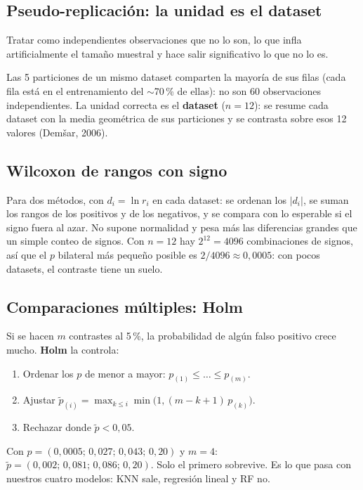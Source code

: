 \documentclass[apuntes]{uc3mmaster}
\begin{document}
\subsection{Pseudo-replicación: la unidad es el dataset}
\begin{definicion}
Tratar como independientes observaciones que no lo son, lo que infla artificialmente el tamaño muestral y hace
salir significativo lo que no lo es.
\end{definicion}
Las 5 particiones de un mismo dataset comparten la mayoría de sus filas (cada fila está en el entrenamiento del
$\sim$70\,\% de ellas): no son 60 observaciones independientes. La unidad correcta es el \textbf{dataset} ($n=12$):
se resume cada dataset con la media geométrica de sus particiones y se contrasta sobre esos 12 valores
(Demšar, 2006).

\subsection{Wilcoxon de rangos con signo}
Para dos métodos, con $d_i=\ln r_i$ en cada dataset: se ordenan los $|d_i|$, se suman los rangos de los positivos
y de los negativos, y se compara con lo esperable si el signo fuera al azar. No supone normalidad y pesa más las
diferencias grandes que un simple conteo de signos. Con $n=12$ hay $2^{12}=4096$ combinaciones de signos, así que el
$p$ bilateral más pequeño posible es $2/4096\approx0{,}0005$: con pocos datasets, el contraste tiene un suelo.

\subsection{Comparaciones múltiples: Holm}
Si se hacen $m$ contrastes al 5\,\%, la probabilidad de algún falso positivo crece mucho. \textbf{Holm} la controla:
\begin{enumerate}
\item Ordenar los $p$ de menor a mayor: $p_{(1)}\le\dots\le p_{(m)}$.
\item Ajustar $\tilde p_{(i)}=\max_{k\le i}\min\big(1,(m-k+1)\,p_{(k)}\big)$.
\item Rechazar donde $\tilde p<0{,}05$.
\end{enumerate}
\begin{ejemplo}
Con $p=(0{,}0005;\,0{,}027;\,0{,}043;\,0{,}20)$ y $m=4$: $\tilde p=(0{,}002;\,0{,}081;\,0{,}086;\,0{,}20)$. Solo el
primero sobrevive. Es lo que pasa con nuestros cuatro modelos: KNN sale, regresión lineal y RF no.
\end{ejemplo}
\end{document}
